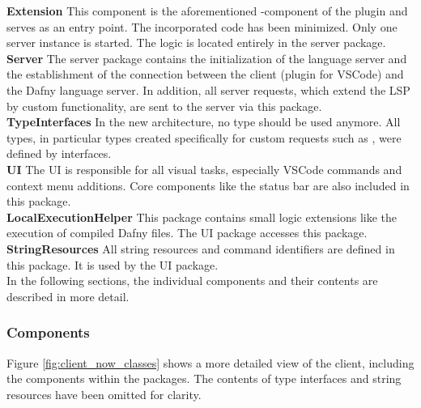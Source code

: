 {\bf Extension} \textendash{}
This component is the aforementioned -component of the plugin and serves as an entry point.
The incorporated code has been minimized.
Only one server instance is started.
The logic is located entirely in the server package.\\

{\bf Server} \textendash{}
The server package contains the initialization of the language server and the establishment of the connection between the client (plugin for VSCode) and the Dafny language server.
In addition, all server requests, which extend the LSP by custom functionality, are sent to the server via this package.\\

{\bf TypeInterfaces} \textendash{}
In the new architecture, no  type should be used anymore.
All types, in particular types created specifically for custom requests such as , were defined by interfaces. \\

{\bf UI} \textendash{}
The UI is responsible for all visual tasks, especially VSCode commands and context menu additions.
Core components like the status bar are also included in this package.\\

{\bf LocalExecutionHelper} \textendash{}
This package contains small logic extensions like the execution of compiled Dafny files.
The UI package accesses this package.\\

{\bf StringResources} \textendash{} 
All string resources and command identifiers are defined in this package.
It is used by the UI package. \\

In the following sections, the individual components and their contents are described in more detail.

\subsubsection{Components}
Figure \ref{fig:client_now_classes} shows a more detailed view of the client, including the components within the packages.
The contents of type interfaces and string resources have been omitted for clarity.\\

